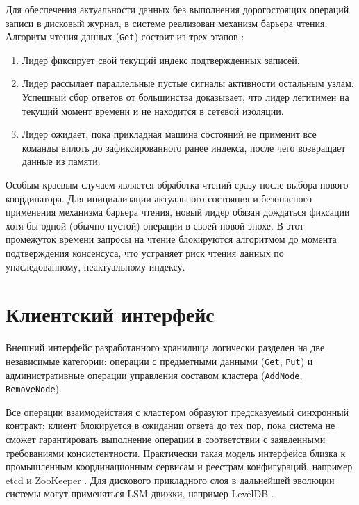 Для обеспечения актуальности данных без выполнения дорогостоящих операций записи в дисковый журнал, в системе реализован механизм барьера чтения. Алгоритм чтения данных (\texttt{Get}) состоит из трех этапов \cite{raft_dissertation,linearizability}:

\begin{enumerate}
    \item Лидер фиксирует свой текущий индекс подтвержденных записей.
    \item Лидер рассылает параллельные пустые сигналы активности остальным узлам. Успешный сбор ответов от большинства доказывает, что лидер легитимен на текущий момент времени и не находится в сетевой изоляции.
    \item Лидер ожидает, пока прикладная машина состояний не применит все команды вплоть до зафиксированного ранее индекса, после чего возвращает данные из памяти.
\end{enumerate}

Особым краевым случаем является обработка чтений сразу после выбора нового координатора. Для инициализации актуального состояния и безопасного применения механизма барьера чтения, новый лидер обязан дождаться фиксации хотя бы одной (обычно пустой) операции в своей новой эпохе. В этот промежуток времени запросы на чтение блокируются алгоритмом до момента подтверждения консенсуса, что устраняет риск чтения данных по унаследованному, неактуальному индексу.

\section{Клиентский интерфейс}

Внешний интерфейс разработанного хранилища логически разделен на две независимые категории: операции с предметными данными (\texttt{Get}, \texttt{Put}) и административные операции управления составом кластера (\texttt{AddNode}, \texttt{RemoveNode}).

Все операции взаимодействия с кластером образуют предсказуемый синхронный контракт: клиент блокируется в ожидании ответа до тех пор, пока система не сможет гарантировать выполнение операции в соответствии с заявленными требованиями консистентности. Практически такая модель интерфейса близка к промышленным координационным сервисам и реестрам конфигураций, например etcd и ZooKeeper \cite{etcd_docs,zookeeper}. Для дискового прикладного слоя в дальнейшей эволюции системы могут применяться LSM-движки, например LevelDB \cite{leveldb}.
